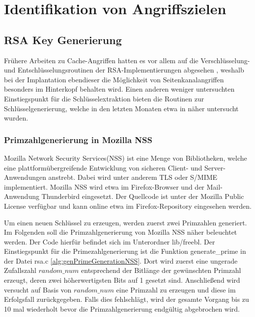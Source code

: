 \chapter{Identifikation von Angriffszielen}
\label{chapter:results}

\section{RSA Key Generierung}

Frühere Arbeiten zu Cache-Angriffen hatten es vor allem auf die Verschlüsselung- und Entschlüsselungsroutinen der RSA-Implementierungen abgesehen \cite{FlushReload, CacheBleedOpenSSLRSA}, weshalb bei der Implantation ebendieser die Möglichkeit von Seitenkanalangriffen besonders im Hinterkopf behalten wird. 
Einen anderen weniger untersuchten Einstiegspunkt für die Schlüsselextraktion bieten die Routinen zur Schlüsselgenerierung, welche in den letzten Monaten etwa in \cite{RSAKeyGeneration2} näher untersucht wurden.

\subsection{Primzahlgenerierung in Mozilla NSS}

Mozilla Network Security Services(NSS) ist eine Menge von Bibliotheken, welche eine plattformübergreifende Entwicklung von sicheren Client- und Server-Anwendungen anstrebt. Dabei wird unter anderem TLS oder S/MIME implementiert. Mozilla NSS wird etwa im Firefox-Browser und der Mail-Anwendung Thunderbird eingesetzt.
Der Quellcode ist unter der Mozilla Public License verfügbar und kann online etwa im Firefox-Repository \cite{MozillaDXR} eingesehen werden.

Um einen neuen Schlüssel zu erzeugen, werden zuerst zwei Primzahlen generiert. 
Im Folgenden soll die Primzahlgenerierung von Mozilla NSS näher beleuchtet werden.
Der Code hierfür befindet sich im Unterordner lib/freebl.
Der Einstiegspunkt für die Primezahlgenerierung ist die Funktion generate_prime in der Datei rsa.c \ref{alg:genPrimeGenerationNSS}.
Dort wird zuerst eine ungerade Zufallszahl $random\_num$ entsprechend der Bitlänge der gewünschten Primzahl erzeugt, deren zwei höherwertigsten Bits auf 1 gesetzt sind.
Anschließend wird versucht auf Basis von $random\_num$ eine Primzahl zu erzeugen und diese im Erfolgsfall zurückgegeben.
Falls dies fehlschlägt, wird der gesamte Vorgang bis zu 10 mal wiederholt bevor die Primzahlgenerierung endgültig abgebrochen wird.

